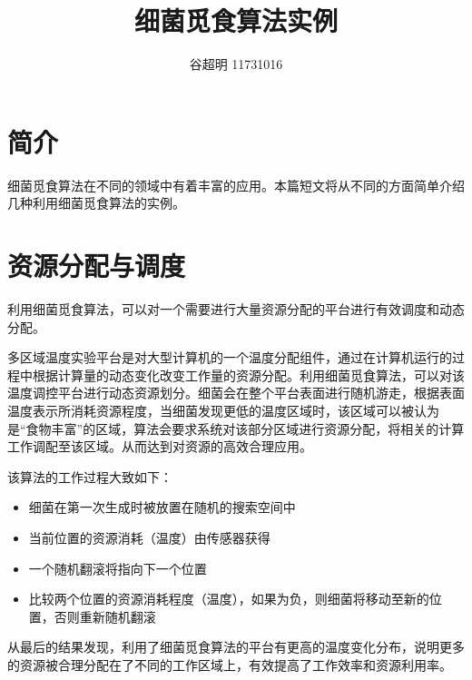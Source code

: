 \documentclass{article}
\begin{document}
\title{细菌觅食算法实例}
\author{谷超明 11731016}
\date{}
\maketitle
\tableofcontents

\section{简介}
细菌觅食算法在不同的领域中有着丰富的应用。本篇短文将从不同的方面简单介绍几种利用细菌觅食算法的实例。

\section{资源分配与调度}
利用细菌觅食算法，可以对一个需要进行大量资源分配的平台进行有效调度和动态分配。

多区域温度实验平台是对大型计算机的一个温度分配组件，通过在计算机运行的过程中根据计算量的动态变化改变工作量的资源分配。利用细菌觅食算法，可以对该温度调控平台进行动态资源划分\cite{ref1}。细菌会在整个平台表面进行随机游走，根据表面温度表示所消耗资源程度，当细菌发现更低的温度区域时，该区域可以被认为是“食物丰富”的区域，算法会要求系统对该部分区域进行资源分配，将相关的计算工作调配至该区域。从而达到对资源的高效合理应用。

该算法的工作过程大致如下：
\begin{itemize}
	\item 细菌在第一次生成时被放置在随机的搜索空间中
	\item 当前位置的资源消耗（温度）由传感器获得
	\item 一个随机翻滚将指向下一个位置
	\item 比较两个位置的资源消耗程度（温度），如果为负，则细菌将移动至新的位置，否则重新随机翻滚
\end{itemize}

从最后的结果发现，利用了细菌觅食算法的平台有更高的温度变化分布，说明更多的资源被合理分配在了不同的工作区域上，有效提高了工作效率和资源利用率。
\end{document}
